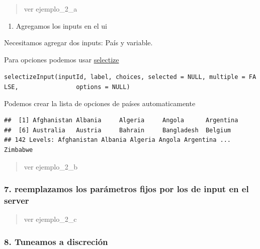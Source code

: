 \documentclass[]{book}
\newenvironment{Shaded}{\begin{snugshade}}{\end{snugshade}}
\newcommand{\DecValTok}[1]{\textcolor[rgb]{0.00,0.00,0.81}{#1}}
\newcommand{\KeywordTok}[1]{\textcolor[rgb]{0.13,0.29,0.53}{\textbf{#1}}}
\newcommand{\NormalTok}[1]{#1}
\newcommand{\OperatorTok}[1]{\textcolor[rgb]{0.81,0.36,0.00}{\textbf{#1}}}
\providecommand{\tightlist}{%
  \setlength{\itemsep}{0pt}\setlength{\parskip}{0pt}}
\begin{document}
\begin{quote}
ver ejemplo\_2\_a
\end{quote}

\begin{enumerate}
\def\labelenumi{\arabic{enumi}.}
\setcounter{enumi}{5}
\tightlist
\item
  Agregamos los inputs en el ui
\end{enumerate}

Necesitamos agregar dos inputs: País y variable.

Para opciones podemos usar \href{https://shiny.rstudio.com/articles/selectize.html}{selectize}

\texttt{selectizeInput(inputId,\ label,\ choices,\ selected\ =\ NULL,\ multiple\ =\ FALSE,\ \ \ \ \ \ \ \ \ \ \ \ \ \ \ \ options\ =\ NULL)}

Podemos crear la lista de opciones de países automaticamente

\begin{Shaded}
\end{Shaded}

\begin{verbatim}
##  [1] Afghanistan Albania     Algeria     Angola      Argentina  
##  [6] Australia   Austria     Bahrain     Bangladesh  Belgium    
## 142 Levels: Afghanistan Albania Algeria Angola Argentina ... Zimbabwe
\end{verbatim}

\begin{quote}
ver ejemplo\_2\_b
\end{quote}

\hypertarget{reemplazamos-los-parametros-fijos-por-los-de-input-en-el-server}{%
\subsubsection{7. reemplazamos los parámetros fijos por los de input en el server}\label{reemplazamos-los-parametros-fijos-por-los-de-input-en-el-server}}

\begin{quote}
ver ejemplo\_2\_c
\end{quote}

\hypertarget{tuneamos-a-discrecion}{%
\subsubsection{8. Tuneamos a discreción}\label{tuneamos-a-discrecion}}
\end{document}
